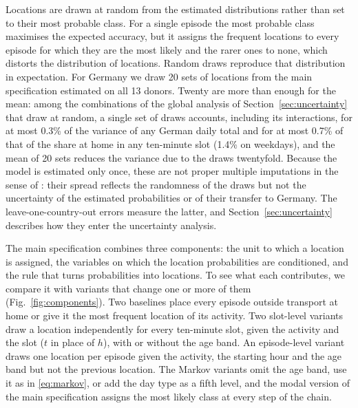 \documentclass[a4paper]{article}
\begin{document}
Locations are drawn at random from the estimated distributions rather than set to their most probable class. For a single episode the most probable class maximises the expected accuracy, but it assigns the frequent locations to every episode for which they are the most likely and the rarer ones to none, which distorts the distribution of locations. Random draws reproduce that distribution in expectation. For Germany we draw 20 sets of locations from the main specification estimated on all 13 donors. Twenty are more than enough for the mean: among the combinations of the global analysis of Section~\ref{sec:uncertainty} that draw at random, a single set of draws accounts, including its interactions, for at most 0.3\% of the variance of any German daily total and for at most 0.7\% of that of the share at home in any ten-minute slot (1.4\% on weekdays), and the mean of 20 sets reduces the variance due to the draws twentyfold. Because the model is estimated only once, these are not proper multiple imputations in the sense of \textcite{rubinMultipleImputationNonresponse1987}: their spread reflects the randomness of the draws but not the uncertainty of the estimated probabilities or of their transfer to Germany. The leave-one-country-out errors measure the latter, and Section~\ref{sec:uncertainty} describes how they enter the uncertainty analysis.

The main specification combines three components: the unit to which a location is assigned, the variables on which the location probabilities are conditioned, and the rule that turns probabilities into locations. To see what each contributes, we compare it with variants that change one or more of them (Fig.~\ref{fig:components}). Two baselines place every episode outside transport at home or give it the most frequent location of its activity. Two slot-level variants draw a location independently for every ten-minute slot, given the activity and the slot ($t$ in place of $h$), with or without the age band. An episode-level variant draws one location per episode given the activity, the starting hour and the age band but not the previous location. The Markov variants omit the age band, use it as in \eqref{eq:markov}, or add the day type as a fifth level, and the modal version of the main specification assigns the most likely class at every step of the chain.
\end{document}
